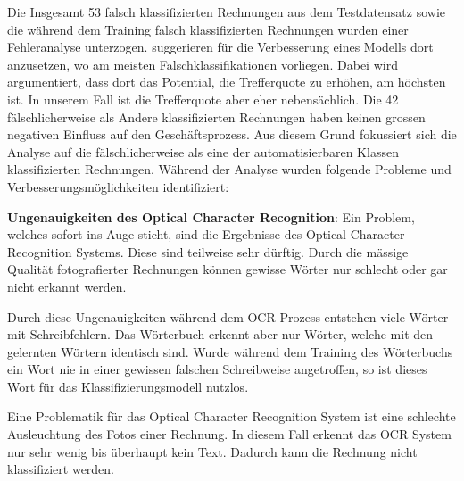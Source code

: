 

Die Insgesamt 53 falsch klassifizierten Rechnungen aus dem Testdatensatz sowie die während dem Training falsch klassifizierten Rechnungen wurden einer Fehleranalyse unterzogen. \textcite{MLYearning} suggerieren für die Verbesserung eines Modells dort anzusetzen, wo am meisten Falschklassifikationen vorliegen. Dabei wird argumentiert, dass dort das Potential, die Trefferquote zu erhöhen, am höchsten ist. In unserem Fall ist die Trefferquote aber eher nebensächlich. Die 42 fälschlicherweise als Andere klassifizierten Rechnungen haben keinen grossen negativen Einfluss auf den Geschäftsprozess. Aus diesem Grund fokussiert sich die Analyse auf die fälschlicherweise als eine der automatisierbaren Klassen klassifizierten Rechnungen. Während der Analyse wurden folgende Probleme und Verbesserungsmöglichkeiten identifiziert:

\newpage


\label{chap:ocr-quality}
\textbf{Ungenauigkeiten des Optical Character Recognition}: Ein Problem, welches sofort ins Auge sticht, sind die Ergebnisse des Optical Character Recognition Systems. Diese sind teilweise sehr dürftig. Durch die mässige Qualität fotografierter Rechnungen können gewisse Wörter nur schlecht oder gar nicht erkannt werden. 

Durch diese Ungenauigkeiten während dem OCR Prozess entstehen viele Wörter mit Schreibfehlern. Das Wörterbuch erkennt aber nur Wörter, welche mit den gelernten Wörtern identisch sind. Wurde während dem Training des Wörterbuchs ein Wort nie in einer gewissen falschen Schreibweise angetroffen, so ist dieses Wort für das Klassifizierungsmodell nutzlos.

Eine Problematik für das Optical Character Recognition System ist eine schlechte Ausleuchtung des Fotos einer Rechnung. In diesem Fall erkennt das OCR System nur sehr wenig bis überhaupt kein Text. Dadurch kann die Rechnung nicht klassifiziert werden.

